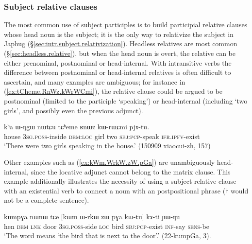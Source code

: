 \subsubsection{Subject relative clauses}  \label{sec:subject.participle.subject.relative}
The most common use of subject participles is to build participial relative clauses whose head noun is the subject; it is the only way to relativize the subject in Japhug (§\ref{sec:intr.subject.relativization}). Headless relatives are most common (§\ref{sec:headless.relative}), but when the head noun is overt, the relative can be either prenominal, postnominal or head-internal. With intransitive verbs the difference between postnominal or head-internal relatives is often difficult to ascertain, and many examples are ambiguous; for instance in (\ref{ex:tCheme.RnWz.kWrWCmi}), the relative clause could be argued to be postnominal (limited to the participle  `speaking') or head-internal (including  `two girls', and possibly even the previous adjunct).

\begin{exe}
\ex \label{ex:tCheme.RnWz.kWrWCmi}
 \gll  kʰa ɯ-ŋgɯ nɯtɕu tɕʰeme ʁnɯz kɯ-rɯɕmi pjɤ-tu. \\
 house \textsc{3sg}.\textsc{poss}-inside \textsc{dem}:\textsc{loc} girl two \textsc{sbj}:\textsc{pcp}-speak \textsc{ifr}.\textsc{ipfv}-exist \\
\glt  `There were two girls speaking in the house.' (150909 xiaocui-zh, 157)
\end{exe}

Other examples such as (\ref{ex:kWm.WrkW.zW.pGa}) are unambiguously head-internal, since the locative adjunct  cannot belong to the matrix clause. This example additionally illustrates the necessity of using a subject relative clause with an existential verb to connect a noun with an postpositional phrase ($\dagger$ would not be a complete sentence).

\begin{exe}
\ex \label{ex:kWm.WrkW.zW.pGa}
 \gll  kumpɣa nɯnɯ tɕe [kɯm ɯ-rkɯ zɯ pɣa kɯ-tu] kɤ-ti ɲɯ-ŋu  \\
 hen \textsc{dem} \textsc{lnk} door \textsc{3sg}.\textsc{poss}-side \textsc{loc} bird \textsc{sbj}:\textsc{pcp}-exist \textsc{inf}-say \textsc{sens}-be \\
 \glt `The word  means `the bird that is next to the door'.' (22-kumpGa, 3). 
\end{exe}

